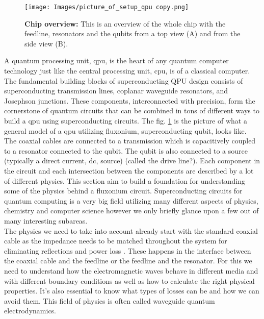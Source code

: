 \begin{figure}[h]
    \centering
        \texttt{[image: Images/picture\_of\_setup\_qpu copy.png]}
        \caption[Chip overview]{\textbf{Chip overview:} This is an overview of the whole chip with the feedline, resonators and the qubits from a top view (A) and from the side view (B).}
        \label{fig:setup_qpu}
\end{figure}
A quantum processing unit, \acrshort{qpu}, is the heart of any quantum computer technology just like the central processing unit, \acrshort{cpu}, is of a classical computer. The fundamental building blocks of superconducting QPU design consists of superconducting transmission lines, coplanar waveguide resonators, and Josephson junctions. These components, interconnected with precision, form the cornerstone of quantum circuits that can be combined in tons of different ways to build a \acrshort{qpu} using superconducting circuits. The fig. \ref{fig:setup_qpu} is the picture of what a general model of a \acrshort{qpu} utilizing fluxonium, superconducting qubit, looks like. The coaxial cables are connected to a transmission which is capacitively coupled to a resonator connected to the qubit. The qubit is also connected to a source (typically a direct current, \acrshort{dc}, source) (called the drive line?). Each component in the circuit and each intersection between the components are described by a lot of different physics. This section aim to build a foundation for understanding some of the physics behind a fluxonium circuit. Superconducting circuits for quantum computing is a very big field utilizing many different aspects of physics, chemistry and computer science however we only briefly glance upon a few out of many interesting subareas.  
\\
The physics we need to take into account already start with the standard coaxial cable as the impedance needs to be matched throughout the system for eliminating reflections and power loss \cite{Pozar2012}. These happens in the interface between the coaxial cable and the feedline or the feedline and the resonator. For this we need to understand how the electromagnetic waves behave in different media and with different boundary conditions as well as how to calculate the right physical properties. It's also essential to know what types of losses can be and how we can avoid them. This field of physics is often called waveguide quantum electrodynamics. 
